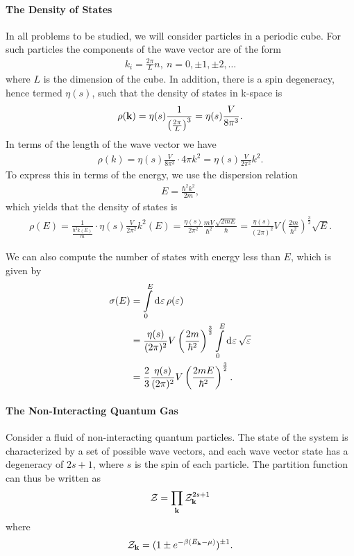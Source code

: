 \paragraph{The Density of States}
In all problems to be studied, we will consider particles in a periodic cube. For such particles the components of the wave vector are of the form
\begin{align*}
	k_{i} = \frac{2\pi}{L}n,\ n = 0, \pm 1, \pm 2, \dots
\end{align*}
where $L$ is the dimension of the cube. In addition, there is a spin degeneracy, hence termed $\eta(s)$, such that the density of states in k-space is
\begin{align*}
	\rho(\vb{k}) = \eta(s)\frac{1}{\left(\frac{2\pi}{L}\right)^{3}} = \eta(s)\frac{V}{8\pi^{3}}.
\end{align*}
In terms of the length of the wave vector we have
\begin{align*}
	\rho(k) = \eta(s)\frac{V}{8\pi^{3}}\cdot 4\pi k^{2} = \eta(s)\frac{V}{2\pi^{2}}k^{2}.
\end{align*}
To express this in terms of the energy, we use the dispersion relation
\begin{align*}
E = \frac{\hbar^{2}k^{2}}{2m},
\end{align*}
which yields that the density of states is
\begin{align*}
\rho(E) = \frac{1}{\frac{\hbar^{2}k(E)}{m}}\cdot \eta(s)\frac{V}{2\pi^{2}}k^{2}(E) = \frac{\eta(s)}{2\pi^{2}}\frac{mV}{\hbar^{2}}\frac{\sqrt{2mE}}{\hbar} = \frac{\eta(s)}{(2\pi)^{2}}V\left(\frac{2m}{\hbar^{2}}\right)^{\frac{3}{2}}\sqrt{E}.
\end{align*}

We can also compute the number of states with energy less than $E$, which is given by
\begin{align*}
\sigma(E) &= \int\limits_{0}^{E}\dd[]{\varepsilon}\rho(\varepsilon) \\
          &= \frac{\eta(s)}{(2\pi)^{2}}V\left(\frac{2m}{\hbar^{2}}\right)^{\frac{3}{2}}\int\limits_{0}^{E}\dd[]{\varepsilon}\sqrt{\varepsilon} \\
          &= \frac{2}{3}\frac{\eta(s)}{(2\pi)^{2}}V\left(\frac{2mE}{\hbar^{2}}\right)^{\frac{3}{2}}.
\end{align*}

\paragraph{The Non-Interacting Quantum Gas}
Consider a fluid of non-interacting quantum particles. The state of the system is characterized by a set of possible wave vectors, and each wave vector state has a degeneracy of $2s + 1$, where $s$ is the spin of each particle. The partition function can thus be written as
\begin{align*}
	\mathcal{Z} = \prod\limits_{\vb{k}}\mathcal{Z}_{\vb{k}}^{2s + 1}
\end{align*}
where
\begin{align*}
	\mathcal{Z}_{\vb{k}} = (1 \pm e^{-\beta(E_{\vb{k}} - \mu)})^{\pm 1}.
\end{align*}

